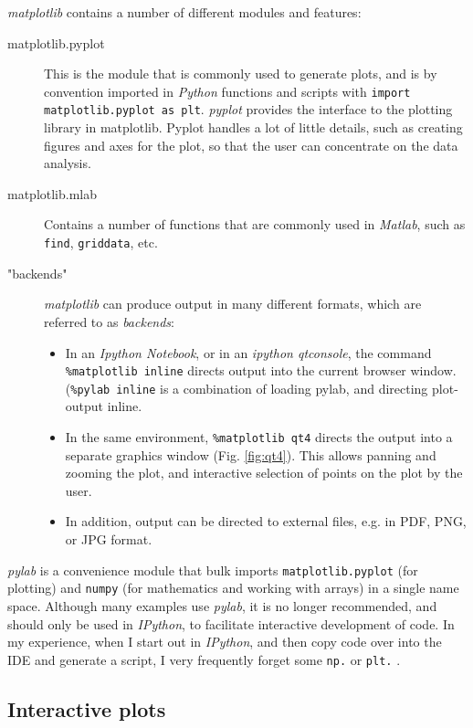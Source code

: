 \emph{matplotlib} contains a number of different modules and features:
\begin{description}
  \item[matplotlib.pyplot] This is the module that is commonly used to generate plots, and is by convention imported in \emph{Python} functions and scripts with \lstinline{import matplotlib.pyplot as plt}. \emph{pyplot}  provides the interface to the plotting library in matplotlib. Pyplot handles a lot of little details, such as creating figures and axes for the plot, so that the user can concentrate on the data analysis.
  \item[matplotlib.mlab] Contains a number of functions that are commonly used in \emph{Matlab}, such as \lstinline{find}, \lstinline{griddata}, etc.
  \item["backends"] \emph{matplotlib} can produce output in many different formats, which are referred to as \emph{backends}:
    \begin{itemize}
      \item In an \emph{Ipython Notebook}, or in an \emph{ipython qtconsole}, the command \lstinline{%matplotlib inline} directs output into the current browser window. (\lstinline{%pylab inline} is a combination of loading pylab, and directing plot-output inline.
      \item In the same environment, \lstinline{%matplotlib qt4} directs the output into a separate graphics window (Fig. \ref{fig:qt4}). This allows panning and zooming the plot, and interactive selection of points on the plot by the user.
      \item In addition, output can be directed to external files, e.g. in PDF, PNG, or JPG format.
    \end{itemize}
\end{description}

\emph{pylab} is a convenience module that bulk imports \lstinline{matplotlib.pyplot} (for plotting) and \lstinline{numpy} (for mathematics and working with arrays) in a single name space. Although many examples use \emph{pylab}, it is no longer recommended, and should only be used in \emph{IPython}, to facilitate interactive development of code. In my experience, when I start out in \emph{IPython}, and then copy code over into the IDE and generate a script, I very frequently forget some \lstinline{np.} or \lstinline{plt.} .

\subsection{Interactive plots}

